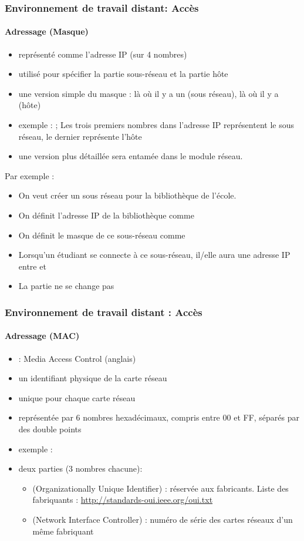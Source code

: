 \documentclass[xcolor=table]{beamer}
\begin{document}
\begin{frame}
\frametitle{Environnement de travail distant: Accès}
\framesubtitle{Adressage (Masque)}

\begin{itemize}
	\item représenté comme l'adresse IP (sur 4 nombres)
	\item utilisé pour spécifier la partie sous-réseau et la partie hôte
	\item une version simple du masque : là où il y a un  (sous réseau), là où il y a  (hôte)
	\item exemple : ; Les trois premiers nombres dans l'adresse IP représentent le sous réseau, le dernier représente l'hôte 
	\item une version plus détaillée sera entamée dans le module réseau.
\end{itemize}

Par exemple : 
\begin{itemize}
	\item On veut créer un sous réseau pour la bibliothèque de l'école. 
	\item On définit l'adresse IP de la bibliothèque comme 
	\item On définit le masque de ce sous-réseau comme 
	\item Lorsqu'un étudiant se connecte à ce sous-réseau, il/elle aura une adresse IP entre  et  
	\item La partie  ne se change pas 
\end{itemize}

\end{frame}

\begin{frame}
\frametitle{Environnement de travail distant : Accès}
\framesubtitle{Adressage (MAC)}

\begin{itemize}
	\item {} : Media Access Control (anglais)
	\item un identifiant physique de la carte réseau 
	\item unique pour chaque carte réseau  
	\item représentée par 6 nombres hexadécimaux, compris entre 00 et FF, séparés par des double points
	\item exemple : 
	\item deux parties (3 nombres chacune): 
	\begin{itemize}
		\item {} (Organizationally Unique Identifier) : réservée aux fabricants. 
		Liste des fabriquants : \url{http://standards-oui.ieee.org/oui.txt}
		\item {} (Network Interface Controller) : numéro de série des cartes réseaux d'un même fabriquant
	\end{itemize}
\end{itemize}

\end{frame}
\end{document}
